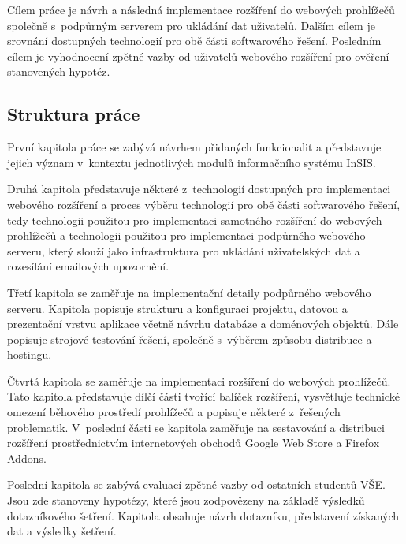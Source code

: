 Cílem práce je návrh a následná implementace rozšíření do webových prohlížečů společně s~podpůrným serverem pro ukládání dat uživatelů. Dalším cílem je srovnání dostupných technologií pro obě části softwarového řešení. Posledním cílem je vyhodnocení zpětné vazby od uživatelů webového rozšíření pro ověření stanovených hypotéz.

\subsection*{Struktura práce}

První kapitola práce se zabývá návrhem přidaných funkcionalit a představuje jejich význam v~kontextu jednotlivých modulů informačního systému InSIS.

Druhá kapitola představuje některé z~technologií dostupných pro implementaci webového rozšíření a proces výběru technologií pro obě části softwarového řešení, tedy technologii použitou pro implementaci samotného rozšíření do webových prohlížečů a technologii použitou pro implementaci podpůrného webového serveru, který slouží jako infrastruktura pro ukládání uživatelských dat a rozesílání emailových upozornění.

Třetí kapitola se zaměřuje na implementační detaily podpůrného webového serveru. Kapitola popisuje strukturu a konfiguraci projektu, datovou a prezentační vrstvu aplikace včetně návrhu databáze a doménových objektů. Dále popisuje strojové testování řešení, společně s~výběrem způsobu distribuce a hostingu.  

Čtvrtá kapitola se zaměřuje na implementaci rozšíření do webových prohlížečů. Tato kapitola představuje dílčí části tvořící balíček rozšíření, vysvětluje technické omezení běhového prostředí prohlížečů a popisuje některé z~řešených problematik. V~poslední části se kapitola zaměřuje na sestavování a distribuci rozšíření prostřednictvím internetových obchodů Google Web Store a Firefox Addons.

Poslední kapitola se zabývá evaluací zpětné vazby od ostatních studentů VŠE. Jsou zde stanoveny hypotézy, které jsou zodpovězeny na základě výsledků dotazníkového šetření. Kapitola obsahuje návrh dotazníku, představení získaných dat a výsledky šetření. 



